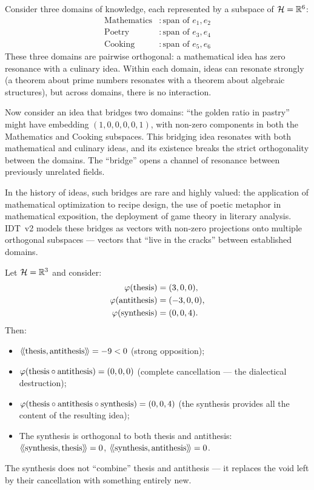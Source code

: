 \begin{example}
\label{ex:orthogonal-domains}
Consider three domains of knowledge, each represented by a subspace of
$\mathcal{H} = \mathbb{R}^6$:
\begin{align*}
  \text{Mathematics} &: \text{span of } e_1, e_2 \\
  \text{Poetry} &: \text{span of } e_3, e_4 \\
  \text{Cooking} &: \text{span of } e_5, e_6
\end{align*}
These three domains are pairwise orthogonal: a mathematical idea has zero
resonance with a culinary idea. Within each domain, ideas can resonate strongly
(a theorem about prime numbers resonates with a theorem about algebraic
structures), but across domains, there is no interaction.

Now consider an idea that bridges two domains: ``the golden ratio in pastry''
might have embedding $(1, 0, 0, 0, 0, 1)$, with non-zero components in both
the Mathematics and Cooking subspaces. This bridging idea resonates with both
mathematical and culinary ideas, and its existence breaks the strict
orthogonality between the domains. The ``bridge'' opens a channel of resonance
between previously unrelated fields.

In the history of ideas, such bridges are rare and highly valued: the
application of mathematical optimization to recipe design, the use of poetic
metaphor in mathematical exposition, the deployment of game theory in literary
analysis. IDT~v2 models these bridges as vectors with non-zero projections
onto multiple orthogonal subspaces --- vectors that ``live in the cracks''
between established domains.
\end{example}

\begin{example}
\label{ex:dialectic}
Let $\mathcal{H} = \mathbb{R}^3$ and consider:
\begin{align*}
  \varphi(\text{thesis}) &= (3, 0, 0), \\
  \varphi(\text{antithesis}) &= (-3, 0, 0), \\
  \varphi(\text{synthesis}) &= (0, 0, 4).
\end{align*}
Then:
\begin{itemize}
\item $\langle\!\langle \text{thesis}, \text{antithesis} \rangle\!\rangle = -9 < 0$ (strong opposition);
\item $\varphi(\text{thesis} \circ \text{antithesis}) = (0, 0, 0)$ (complete
cancellation --- the dialectical destruction);
\item $\varphi(\text{thesis} \circ \text{antithesis} \circ \text{synthesis})
= (0, 0, 4)$ (the synthesis provides all the content of the resulting idea);
\item The synthesis is orthogonal to both thesis and antithesis: $\langle\!\langle \text{synthesis}, \text{thesis} \rangle\!\rangle = 0$, $\langle\!\langle \text{synthesis}, \text{antithesis} \rangle\!\rangle = 0$.
\end{itemize}
The synthesis does not ``combine'' thesis and antithesis --- it replaces the
void left by their cancellation with something entirely new.
\end{example}


